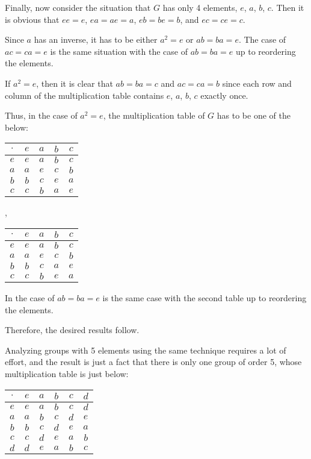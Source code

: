 {    Finally, now consider the situation that $G$ has only 4 elements, $e$, $a$, $b$, $c$. Then it is obvious that $ee = e$, $ea = ae = a$, $eb = be = b$, and $ec = ce = c$.

    Since $a$ has an inverse, it has to be either $a^2 = e$ or $ab = ba = e$. The case of $ac = ca = e$ is the same situation with the case of $ab = ba = e$ up to reordering the elements.

    If $a^2 = e$, then it is clear that $ab = ba = c$ and $ac = ca = b$ since each row and column of the multiplication table contains $e$, $a$, $b$, $c$ exactly once.

    Thus, in the case of $a^2 = e$, the multiplication table of $G$ has to be one of the below:
    \begin{center}
        \begin{tabular}{c||c|c|c|c}
            $\cdot$ & $e$ & $a$ & $b$ & $c$ \\ \hline\hline
            $e$ & $e$ & $a$ & $b$ & $c$ \\ \hline
            $a$ & $a$ & $e$ & $c$ & $b$ \\ \hline
            $b$ & $b$ & $c$ & $e$ & $a$ \\ \hline
            $c$ & $c$ & $b$ & $a$ & $e$
        \end{tabular}, \quad \begin{tabular}{c||c|c|c|c}
            $\cdot$ & $e$ & $a$ & $b$ & $c$ \\ \hline\hline
            $e$ & $e$ & $a$ & $b$ & $c$ \\ \hline
            $a$ & $a$ & $e$ & $c$ & $b$ \\ \hline
            $b$ & $b$ & $c$ & $a$ & $e$ \\ \hline
            $c$ & $c$ & $b$ & $e$ & $a$
        \end{tabular}
    \end{center}

    In the case of $ab = ba = e$ is the same case with the second table up to reordering the elements.

    Therefore, the desired results follow.

    Analyzing groups with 5 elements using the same technique requires a lot of effort, and the result is just a fact that there is only one group of order 5, whose multiplication table is just below:
    \begin{center}
        \begin{tabular}{c||c|c|c|c|c}
            $\cdot$ & $e$ & $a$ & $b$ & $c$ & $d$ \\ \hline\hline
            $e$ & $e$ & $a$ & $b$ & $c$ & $d$ \\ \hline
            $a$ & $a$ & $b$ & $c$ & $d$ & $e$ \\ \hline
            $b$ & $b$ & $c$ & $d$ & $e$ & $a$ \\ \hline
            $c$ & $c$ & $d$ & $e$ & $a$ & $b$ \\ \hline
            $d$ & $d$ & $e$ & $a$ & $b$ & $c$
        \end{tabular}
    \end{center}
}

